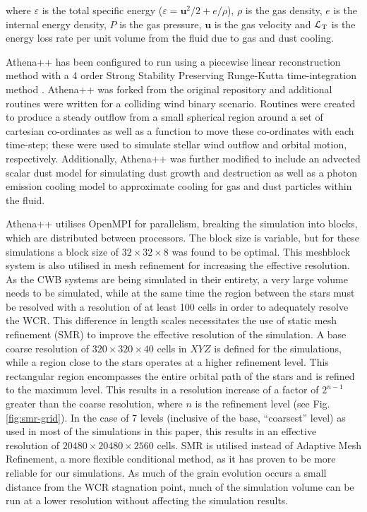 \noindent
where $\varepsilon$ is the total specific energy ($\varepsilon = \boldsymbol{u}^2/2 + e/\rho $), $\rho$ is the gas density, $e$ is the internal energy density, $P$ is the gas pressure, $\boldsymbol{u}$ is the gas velocity and $\mathcal{L}_\text{T}$ is the energy loss rate per unit volume from the fluid due to gas and dust cooling.


Athena++ has been configured to run using a piecewise linear reconstruction method with a 4 order Strong Stability Preserving Runge-Kutta time-integration method \parencite{spiteriNewClassOptimal2002}.
Athena++ was forked from the original repository and additional routines were written for a colliding wind binary scenario.
Routines were created to produce a steady outflow from a small spherical region around a set of cartesian co-ordinates as well as a function to move these co-ordinates with each time-step; these were used to simulate stellar wind outflow and orbital motion, respectively.
Additionally, Athena++ was further modified to include an advected scalar dust model for simulating dust growth and destruction as well as a photon emission cooling model to approximate cooling for gas and dust particles within the fluid.

Athena++ utilises OpenMPI for parallelism, breaking the simulation into blocks, which are distributed between processors.
The block size is variable, but for these simulations a block size of $32\times 32 \times 8$ was found to be optimal.
This meshblock system is also utilised in mesh refinement for increasing the effective resolution.
As the CWB systems are being simulated in their entirety, a very large volume needs to be simulated, while at the same time the region between the stars must be resolved with a resolution of at least 100 cells in order to adequately resolve the WCR.
This difference in length scales necessitates the use of static mesh refinement (SMR) to improve the effective resolution of the simulation.
A base coarse resolution of $320 \times 320 \times 40$ cells in $XYZ$ is defined for the simulations, while a region close to the stars operates at a higher refinement level.
This rectangular region encompasses the entire orbital path of the stars and is refined to the maximum level.
This results in a resolution increase of a factor of $2^{n-1}$ greater than the coarse resolution, where $n$ is the refinement level (see Fig. \ref{fig:smr-grid}).
In the case of 7 levels (inclusive of the base, ``coarsest'' level) as used in most of the simulations in this paper, this results in an effective resolution of $20480 \times 20480 \times 2560$ cells.
SMR is utilised instead of Adaptive Mesh Refinement, a more flexible conditional method, as it has proven to be more reliable for our simulations.
As much of the grain evolution occurs a small distance from the WCR stagnation point, much of the simulation volume can be run at a lower resolution without affecting the simulation results.

